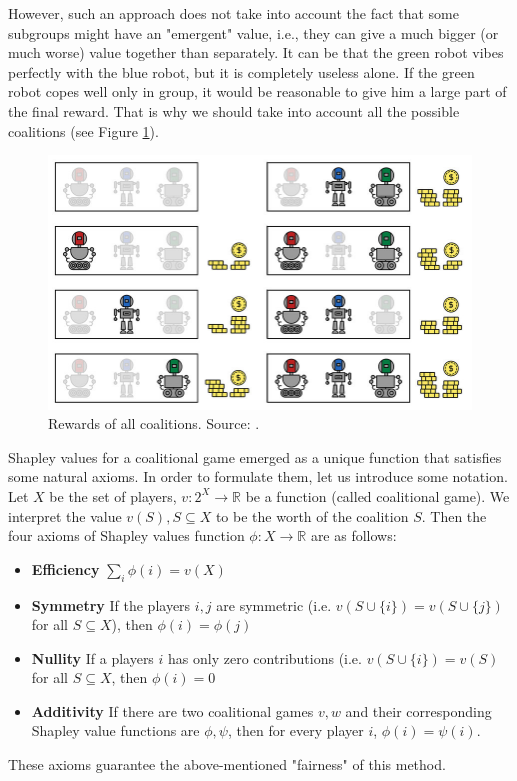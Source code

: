 \documentclass[magisterska,en]{pracamgr}
\begin{document}
However, such an approach does not take into account the fact that some subgroups might have an "emergent" value, i.e., they can give a much bigger (or much worse) value together than separately. It can be that the green robot vibes perfectly with the blue robot, but it is completely useless alone. If the green robot copes well only in group, it would be reasonable to give him a large part of the final reward. That is why we should take into account all the possible coalitions (see Figure \ref{rewards_all}).

\begin{figure}[H]
\centering
\includegraphics[scale=0.3]{./images/Shap_all_coal.png}
\caption{Rewards of all coalitions. Source: \cite{DBLP:conf/ijcai/RozemberczkiWBY22}.}
\label{rewards_all}
\end{figure}

Shapley values for a coalitional game emerged as a unique function that satisfies some natural axioms. In order to formulate them, let us introduce some notation.  Let $X$ be the set of players, $v: 2^X \rightarrow \mathbb{R}$ be a function (called coalitional game). We interpret the value $v(S), S \subseteq X$ to be the worth of the coalition $S$. Then the four axioms of Shapley values function $\phi:X  \rightarrow \mathbb{R}$ are as follows:
\begin{itemize}
\item \textbf{Efficiency}  $\sum_i  \phi(i) = v(X)$
\item \textbf{Symmetry} If the players $i, j$ are symmetric (i.e. $v(S\cup \{i\}) = v(S \cup \{j\})$ for all $S \subseteq X$), then $\phi(i) = \phi(j)$
\item \textbf{Nullity} If a players $i$ has only zero contributions (i.e. $v(S\cup \{i\}) = v(S)$ for all $S \subseteq X$, then $\phi(i) = 0$
\item \textbf{Additivity} If there are two coalitional games $v, w$ and their corresponding Shapley value functions are $\phi, \psi$, then for every player $i$, $\phi(i) = \psi(i)$.
\label{Shapley_axioms}
\end{itemize}
These axioms guarantee the above-mentioned "fairness" of this method. 
\end{document}
